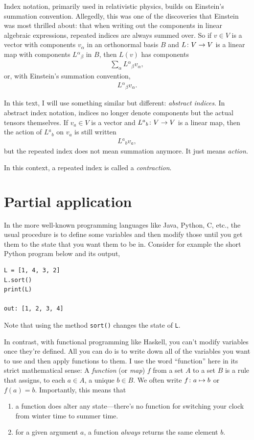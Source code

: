 \documentclass[english, 12pt]{article}
\begin{document}
Index notation, primarily used in relativistic physics, builds on Einstein's summation convention.
Allegedly, this was one of the discoveries that Einstein was most thrilled about: that when writing out the components in linear algebraic expressions, repeated indices are always summed over.
So if \(v \in V\) is a vector with components \(v_\alpha\) in an orthonormal basis \(B\) and \(L \colon V \to V\) is a linear map with components \(L{}^\alpha{}_\beta\) in \(B\), then \(L(v)\) has components
\begin{align*}
	\sum_\alpha L{}^\alpha{}_\beta v_\alpha,
\end{align*}
or, with Einstein's summation convention,
\begin{align*}
	L{}^\alpha{}_\beta v_\alpha.
\end{align*}

In this text, I will use something similar but different: \emph{abstract indices}.
In abstract index notation, indices no longer denote components but the actual tensors themselves.
If \(v_a \in V\) is a vector and \(L{}^a{}_b \colon V \to V\) is a linear map, then the action of \(L{}^a{}_b\) on \(v_a\) is still written
\begin{align*}
	L{}^a{}_b v_a,
\end{align*}
but the repeated index does not mean summation anymore.
It just means \emph{action}.

In this context, a repeated index is called a \emph{contraction}.


\section{Partial application}%
\label{sec:partial_application}

In the more well-known programming languages like Java, Python, C, etc., the usual procedure is to define some variables and then modify those until you get them to the state that you want them to be in.
Consider for example the short Python program below and its output,
\begin{verbatim}
L = [1, 4, 3, 2]
L.sort()
print(L)

out: [1, 2, 3, 4]
\end{verbatim}
Note that using the method \verb|sort()| changes the state of \verb|L|.

In contrast, with functional programming like Haskell, you can't modify variables once they're defined.
All you can do is to write down all of the variables you want to use and then apply functions to them.
I use the word \enquote{function} here in its strict mathematical sense: A \emph{function} (or \emph{map}) \(f\) from a set \(A\) to a set \(B\) is a rule that assigns, to each \(a \in A\), a unique \(b \in B\).
We often write \(f \colon a \mapsto b\) or \(f(a) = b\).
Importantly, this means that
\begin{enumerate}
	\item a function does alter any state---there's no function for switching your clock from winter time to summer time.
	\item for a given argument \(a\), a function \emph{always} returns the same element \(b\).
\end{enumerate}
\end{document}
